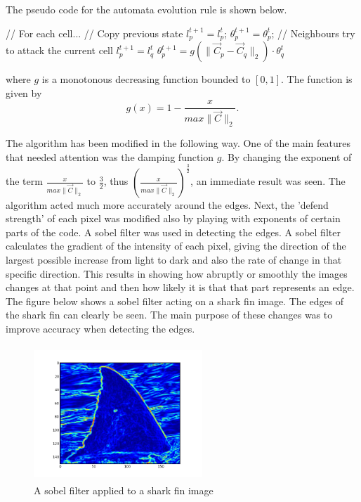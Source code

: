 \documentclass[a4paper,10pt]{article}
\begin{document}
\newpage
\noindent The pseudo code for the automata evolution rule is shown below. 
\begin{algorithm}[H]
\begin{algorithmic}[1]
 \State // For each cell...
 \State // Copy previous state
 \State $l^{t+1}_{p} = l^{t}_{p}$;
 \State $\theta_{p}^{t+1} = \theta_{p}^{t}$;
 \State // Neighbours try to attack the current cell
 \State $l^{t+1}_{p} = l^{t}_{q}$
 \State $\theta^{t+1}_{p} = g(\| \overrightarrow{C}_{p} - \overrightarrow{C}_{q}
\|_{2}) \cdot \theta^{t}_{q}$
 \EndIf
 \EndFor
 \EndFor
\end{algorithmic}
\end{algorithm}

\noindent where $g$ is a monotonous decreasing function bounded to $[0, 1]$. 
The function is given by
\[
g(x) = 1 - \frac{x}{max\| \overrightarrow{C} \|_{2}}. 
\]


\noindent The algorithm has been modified in the following way.  One of the main
features that needed attention was the damping function $g$.  
By changing the exponent of the term $\frac{x}{max\| \overrightarrow{C} \|_{2}}$
to $\frac{3}{2}$, thus $\left ({\frac{x}{max\| \overrightarrow{C} \|_{2}}}\right
) ^\frac{3}{2}$,
an immediate result was seen.  The algorithm acted much more accurately around
the edges.  Next, the 'defend strength' of each pixel was modified also by
playing with exponents
of certain parts of the code.  A sobel filter was used in detecting the edges. 
A sobel filter calculates the gradient of the intensity of each pixel, giving
the direction of the largest possible increase from light to dark and also the
rate of change in that specific direction.   This results in showing how
abruptly or smoothly the images changes at that point and then how likely it is
that that part represents an edge.  The figure below shows a sobel filter acting
on a shark fin image.  The edges of the shark fin can clearly be seen.  The main
purpose of these changes was to improve accuracy when detecting the edges.
\\
\begin{figure}[H]
 \centering
 \includegraphics[width=2.5in, height=2in]{haais}
 \caption{A sobel filter applied to a shark fin image}
 \label{fin1}
\end{figure}
\end{document}
